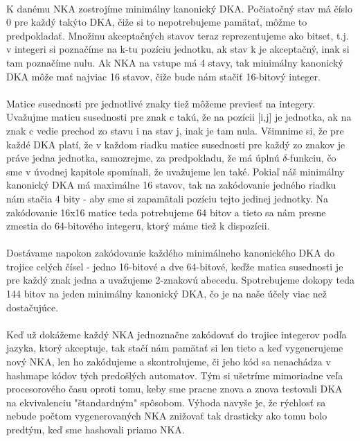 \paragraph{}
K danému NKA zostrojíme minimálny kanonický DKA. Počiatočný stav má číslo 0 pre každý takýto DKA, čiže si to nepotrebujeme pamätať, môžme to predpokladať. Množinu akceptačných stavov teraz reprezentujeme ako bitset, t.j. v integeri si poznačíme na k-tu pozíciu jednotku, ak stav k je akceptačný, inak si tam poznačíme nulu. Ak NKA na vstupe má 4 stavy, tak minimálny kanonický DKA môže mať najviac 16 stavov, čiže bude nám stačiť 16-bitový integer. 
\paragraph{}
Matice susednosti pre jednotlivé znaky tiež môžeme previesť na integery. Uvažujme maticu susednosti pre znak c takú, že na pozícii [i,j] je jednotka, ak na znak c vedie prechod zo stavu i na stav j, inak je tam nula. Všimnime si, že pre každé DKA platí, že v každom riadku matice susednosti pre každý zo znakov je práve jedna jednotka, samozrejme, za predpokladu, že má úplnú $\delta$-funkciu, čo sme v úvodnej kapitole spomínali, že uvažujeme len také. Pokiaľ náš minimálny kanonický DKA má maximálne 16 stavov, tak na zakódovanie jedného riadku nám stačia 4 bity - aby sme si zapamätali pozíciu tejto jedinej jednotky. Na zakódovanie 16x16 matice teda potrebujeme 64 bitov a tieto sa nám presne zmestia do 64-bitového integeru, ktorý máme tiež k dispozícii.
\paragraph{}
Dostávame napokon zakódovanie každého minimálneho kanonického DKA do trojice celých čísel - jedno 16-bitové a dve 64-bitové, keďže matica susednosti je pre každý znak jedna a uvažujeme 2-znakovú abecedu. Spotrebujeme dokopy teda 144 bitov na jeden minimálny kanonický DKA, čo je na naše účely viac než dostačujúce.
\paragraph{}
Keď už dokážeme každý NKA jednoznačne zakódovať do trojice integerov podľa jazyka, ktorý akceptuje, tak stačí nám pamätať si len tieto a keď vygenerujeme nový NKA, len ho zakódujeme a skontrolujeme, či jeho kód sa nenachádza v hashmape kódov tých predošlých automatov. Tým si ušetríme mimoriadne veľa procesorového času oproti tomu, keby sme pracne znova a znova testovali DKA na ekvivalenciu "štandardným" spôsobom. Výhoda navyše je, že rýchlosť sa nebude počtom vygenerovaných NKA znižovať tak drasticky ako tomu bolo predtým, keď sme hashovali priamo NKA.








